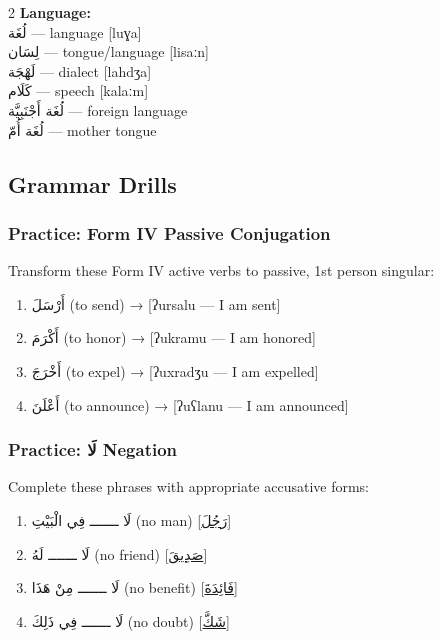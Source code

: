 \documentclass[letterpaper,12pt]{article}
\begin{document}
\begin{multicols}{2}
\textbf{Language:}\\
\textarabic{لُغَة} — language [luɣa]\\
\textarabic{لِسَان} — tongue/language [lisaːn]\\
\textarabic{لَهْجَة} — dialect [lahdʒa]\\
\textarabic{كَلَام} — speech [kalaːm]\\
\textarabic{لُغَة أَجْنَبِيَّة} — foreign language\\
\textarabic{لُغَة أُمّ} — mother tongue
\end{multicols}

\subsection{Grammar Drills}

\subsubsection*{Practice: Form IV Passive Conjugation}
Transform these Form IV active verbs to passive, 1st person singular:

\begin{enumerate}
\item \textarabic{أَرْسَلَ} (to send) → \underline{\hspace{3cm}} [ʔursalu — I am sent]
\item \textarabic{أَكْرَمَ} (to honor) → \underline{\hspace{3cm}} [ʔukramu — I am honored]
\item \textarabic{أَخْرَجَ} (to expel) → \underline{\hspace{3cm}} [ʔuxradʒu — I am expelled]
\item \textarabic{أَعْلَنَ} (to announce) → \underline{\hspace{3cm}} [ʔuʕlanu — I am announced]
\end{enumerate}

\subsubsection*{Practice: \textarabic{لَا} Negation}
Complete these phrases with appropriate accusative forms:

\begin{enumerate}
\item \textarabic{لَا ـــــــ فِي الْبَيْتِ} (no man) [\underline{\textarabic{رَجُلَ}}]
\item \textarabic{لَا ـــــــ لَهُ} (no friend) [\underline{\textarabic{صَدِيقَ}}]
\item \textarabic{لَا ـــــــ مِنْ هَذَا} (no benefit) [\underline{\textarabic{فَائِدَةَ}}]
\item \textarabic{لَا ـــــــ فِي ذَلِكَ} (no doubt) [\underline{\textarabic{شَكَّ}}]
\end{enumerate}
\end{document}
